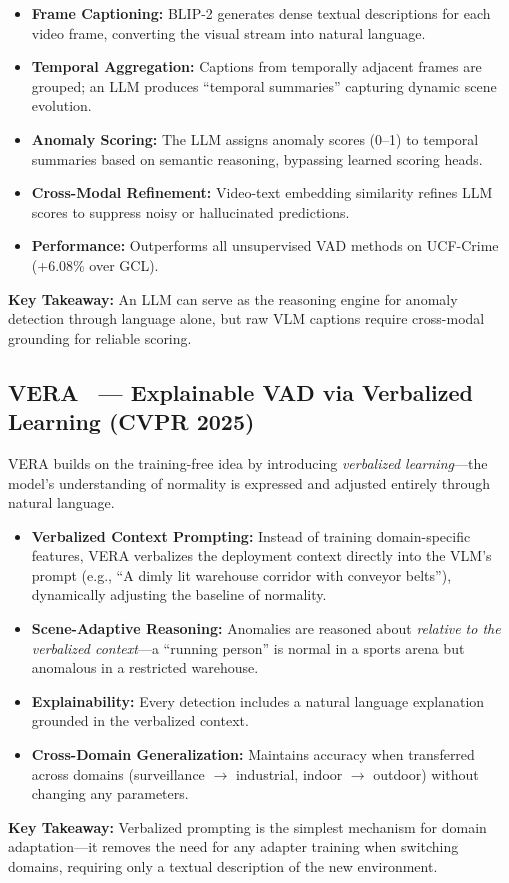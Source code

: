 \begin{itemize}[leftmargin=*]
    \item \textbf{Frame Captioning:} BLIP-2 generates dense textual descriptions for each video frame, converting the visual stream into natural language.
    \item \textbf{Temporal Aggregation:} Captions from temporally adjacent frames are grouped; an LLM produces ``temporal summaries'' capturing dynamic scene evolution.
    \item \textbf{Anomaly Scoring:} The LLM assigns anomaly scores (0--1) to temporal summaries based on semantic reasoning, bypassing learned scoring heads.
    \item \textbf{Cross-Modal Refinement:} Video-text embedding similarity refines LLM scores to suppress noisy or hallucinated predictions.
    \item \textbf{Performance:} Outperforms all unsupervised VAD methods on UCF-Crime (+6.08\% over GCL).
\end{itemize}

\textbf{Key Takeaway:} An LLM can serve as the reasoning engine for anomaly detection through language alone, but raw VLM captions require cross-modal grounding for reliable scoring.

\subsection{VERA~\cite{ye2025vera} — Explainable VAD via Verbalized Learning (CVPR 2025)}

VERA builds on the training-free idea by introducing \textit{verbalized learning}---the model's understanding of normality is expressed and adjusted entirely through natural language.

\begin{itemize}[leftmargin=*]
    \item \textbf{Verbalized Context Prompting:} Instead of training domain-specific features, VERA verbalizes the deployment context directly into the VLM's prompt (e.g., ``A dimly lit warehouse corridor with conveyor belts''), dynamically adjusting the baseline of normality.
    \item \textbf{Scene-Adaptive Reasoning:} Anomalies are reasoned about \textit{relative to the verbalized context}---a ``running person'' is normal in a sports arena but anomalous in a restricted warehouse.
    \item \textbf{Explainability:} Every detection includes a natural language explanation grounded in the verbalized context.
    \item \textbf{Cross-Domain Generalization:} Maintains accuracy when transferred across domains (surveillance $\rightarrow$ industrial, indoor $\rightarrow$ outdoor) without changing any parameters.
\end{itemize}

\textbf{Key Takeaway:} Verbalized prompting is the simplest mechanism for domain adaptation---it removes the need for any adapter training when switching domains, requiring only a textual description of the new environment.

